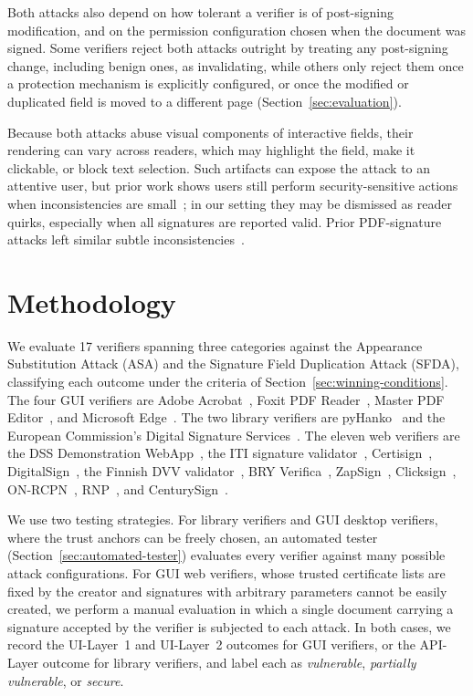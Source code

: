 \documentclass[12pt]{article}
\begin{document}
Both attacks also depend on how tolerant a verifier is of post-signing modification, and on the permission configuration chosen when the document was signed. Some verifiers reject both attacks outright by treating any post-signing change, including benign ones, as invalidating, while others only reject them once a protection mechanism is explicitly configured, or once the modified or duplicated field is moved to a different page (Section~\ref{sec:evaluation}).

Because both attacks abuse visual components of interactive fields, their rendering can vary across readers, which may highlight the field, make it clickable, or block text selection. Such artifacts can expose the attack to an attentive user, but prior work shows users still perform security-sensitive actions when inconsistencies are small~\cite{phishing-password-managers}; in our setting they may be dismissed as reader quirks, especially when all signatures are reported valid. Prior PDF-signature attacks left similar subtle inconsistencies~\cite{pdf-certification-attack}.



\section{Methodology} \label{sec:methodology}

We evaluate 17 verifiers spanning three categories against the Appearance Substitution Attack (ASA) and the Signature Field Duplication Attack (SFDA), classifying each outcome under the criteria of Section~\ref{sec:winning-conditions}. The four GUI verifiers are Adobe Acrobat~\cite{adobereader}, Foxit PDF Reader~\cite{foxitreader}, Master PDF Editor~\cite{masterpdfeditor}, and Microsoft Edge~\cite{microsoftedge}. The two library verifiers are pyHanko~\cite{pyhanko} and the European Commission's Digital Signature Services~\cite{eudss}. The eleven web verifiers are the DSS Demonstration WebApp~\cite{dssdemo}, the ITI signature validator~\cite{itivalidador}, Certisign~\cite{certisign}, DigitalSign~\cite{digitalsign}, the Finnish DVV validator~\cite{dvv}, BRY Verifica~\cite{bry}, ZapSign~\cite{zapsign}, Clicksign~\cite{clicksign}, ON-RCPN~\cite{onrcpn}, RNP~\cite{rnp}, and CenturySign~\cite{centurysign}.

We use two testing strategies. For library verifiers and GUI desktop verifiers, where the trust anchors can be freely chosen, an automated tester (Section~\ref{sec:automated-tester}) evaluates every verifier against many possible attack configurations. For GUI web verifiers, whose trusted certificate lists are fixed by the creator and signatures with arbitrary parameters cannot be easily created, we perform a manual evaluation in which a single document carrying a signature accepted by the verifier is subjected to each attack. In both cases, we record the UI-Layer~1 and UI-Layer~2 outcomes for GUI verifiers, or the API-Layer outcome for library verifiers, and label each as \emph{vulnerable}, \emph{partially vulnerable}, or \emph{secure}.
\end{document}

